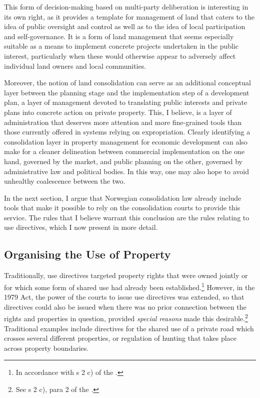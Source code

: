 This form of decision-making based on multi-party deliberation is interesting in its own right, as it provides a template for management of land that caters to the idea of public oversight and control as well as to the idea of local participation and self-governance. It is a form of land management that seems especially suitable as a means to implement concrete projects undertaken in the public interest, particularly when these would otherwise appear to adversely affect individual land owners and local communities.

Moreover, the notion of land consolidation can serve as an additional conceptual layer between the planning stage and the implementation step of a development plan, a layer of management devoted to translating public interests and private plans into concrete action on private property. This, I believe, is a layer of administration that deserves more attention and more fine-grained tools than those currently offered in systems relying on expropriation. Clearly identifying a consolidation layer in property management for economic development can also make for a cleaner delineation between commercial implementation on the one hand, governed by the market, and public planning on the other, governed by administrative law and political bodies. In this way, one may also hope to avoid unhealthy coalescence between the two.

In the next section, I argue that Norwegian consolidation law already include tools that make it possible to rely on the consolidation courts to provide this service. The rules that I believe warrant this conclusion are the rules relating to use directives, which I now present in more detail.

\subsection{Organising the Use of Property}\label{sec:3}

Traditionally, use directives targeted property rights that were owned jointly or for which some form of shared use had already been established.\footnote{In accordance with s 2 c) of the \cite{lca79}.} However, in the 1979 Act, the power of the courts to issue use directives was extended, so that directives could also be issued when there was no prior connection between the rights and properties in question, provided \emph{special reasons} made this desirable.\footnote{See s 2 c), para 2 of the \cite{lca79}.} Traditional examples include directives for the shared use of a private road which crosses several different properties, or regulation of hunting that takes place across property boundaries.

